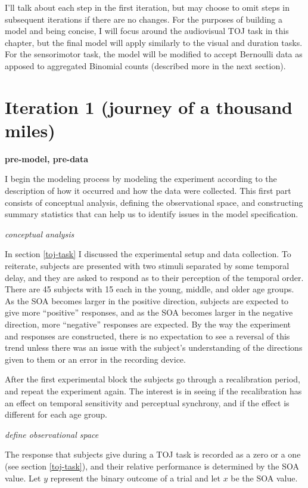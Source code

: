 \documentclass[11pt, oneside, openany]{scrbook}
\begin{document}
I'll talk about each step in the first iteration, but may choose to omit steps in subsequent iterations if there are no changes. For the purposes of building a model and being concise, I will focus around the audiovisual TOJ task in this chapter, but the final model will apply similarly to the visual and duration tasks. For the sensorimotor task, the model will be modified to accept Bernoulli data as apposed to aggregated Binomial counts (described more in the next section).

\hypertarget{iter1}{%
\section{Iteration 1 (journey of a thousand miles)}\label{iter1}}

\textbf{pre-model, pre-data}

I begin the modeling process by modeling the experiment according to the description of how it occurred and how the data were collected. This first part consists of conceptual analysis, defining the observational space, and constructing summary statistics that can help us to identify issues in the model specification.

\emph{conceptual analysis}

In section \ref{toj-task} I discussed the experimental setup and data collection. To reiterate, subjects are presented with two stimuli separated by some temporal delay, and they are asked to respond as to their perception of the temporal order. There are 45 subjects with 15 each in the young, middle, and older age groups. As the SOA becomes larger in the positive direction, subjects are expected to give more ``positive'' responses, and as the SOA becomes larger in the negative direction, more ``negative'' responses are expected. By the way the experiment and responses are constructed, there is no expectation to see a reversal of this trend unless there was an issue with the subject's understanding of the directions given to them or an error in the recording device.

After the first experimental block the subjects go through a recalibration period, and repeat the experiment again. The interest is in seeing if the recalibration has an effect on temporal sensitivity and perceptual synchrony, and if the effect is different for each age group.

\emph{define observational space}

The response that subjects give during a TOJ task is recorded as a zero or a one (see section \ref{toj-task}), and their relative performance is determined by the SOA value. Let \(y\) represent the binary outcome of a trial and let \(x\) be the SOA value.
\end{document}

